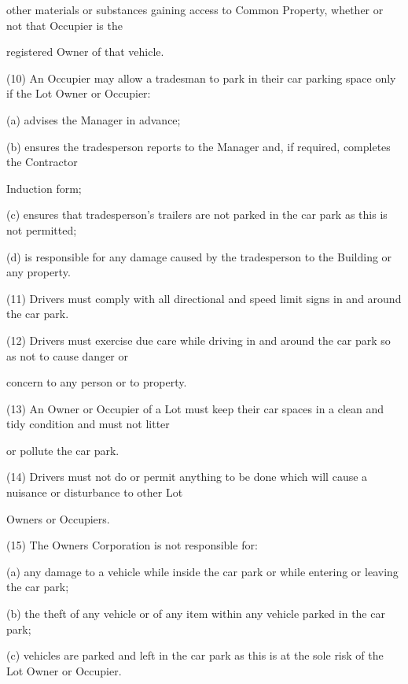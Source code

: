 \documentclass{article}
\begin{document}
{\fontsize{10.02}{1}other materials or substances gaining access to Common Property, whether or not that Occupier is the }

{\fontsize{10.02}{1}registered Owner of that vehicle. }

{\fontsize{9.962}{1}(10) An Occupier may allow a tradesman to park in their car parking space only if the Lot Owner or Occupier: }

{\fontsize{9.962}{1}(a) advises the Manager in advance; }

{\fontsize{9.962}{1}(b) ensures the tradesperson reports to the Manager and, if required, completes the Contractor }

{\fontsize{10.02}{1}Induction form; }

{\fontsize{9.962}{1}(c) ensures that tradesperson’s trailers are not parked in the car park as this is not permitted; }

{\fontsize{9.962}{1}(d) is responsible for any damage caused by the tradesperson to the Building or any property. }

{\fontsize{9.962}{1}(11) Drivers must comply with all directional and speed limit signs in and around the car park. }

{\fontsize{9.962}{1}(12) Drivers must exercise due care while driving in and around the car park so as not to cause danger or }

{\fontsize{10.02}{1}concern to any person or to property. }

{\fontsize{9.962}{1}(13) An Owner or Occupier of a Lot must keep their car spaces in a clean and tidy condition and must not litter }

{\fontsize{10.02}{1}or pollute the car park. }

{\fontsize{9.962}{1}(14) Drivers must not do or permit anything to be done which will cause a nuisance or disturbance to other Lot }

{\fontsize{10.02}{1}Owners or Occupiers. }

{\fontsize{9.962}{1}(15) The Owners Corporation is not responsible for: }

{\fontsize{9.962}{1}(a) any damage to a vehicle while inside the car park or while entering or leaving the car park; }

{\fontsize{9.962}{1}(b) the theft of any vehicle or of any item within any vehicle parked in the car park; }

{\fontsize{9.962}{1}(c) vehicles are parked and left in the car park as this is at the sole risk of the Lot Owner or Occupier. }
\end{document}
